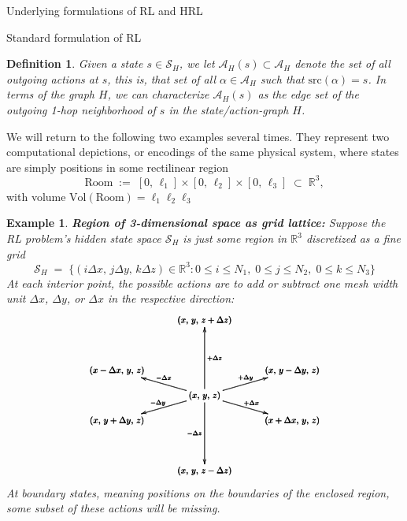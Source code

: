 \documentclass[11pt]{article}
\newtheorem{definition}[subsubsection]{Definition}
\newtheorem{example}[subsubsection]{Example}
\begin{document}
\begin{section}{Underlying formulations of RL and HRL}
\begin{subsection}{Standard formulation of RL}
\begin{definition}
Given a state $s\in\mathcal{S}_{H}$, we let $\mathcal{A}_{H}(s)\subset \mathcal{A}_{H}$ denote the set of all outgoing actions at $s$, this is, that set of all $\alpha\in\mathcal{A}_{H}$ such that
$\text{src}(\alpha)=s$. In terms of the graph $H$, we can characterize $\mathcal{A}_{H}(s)$ as the edge set of the outgoing 1-hop neighborhood of $s$ in the state/action-graph $H$.
\end{definition}

\noindent
We will return to the following two examples several times. They represent two computational depictions, or encodings of the same physical system, where states are simply positions in some rectilinear region
$$
\text{Room}
\;:=\;
[0,\,\ell_1]\times[0,\,\ell_2]\times[0,\,\ell_3]\;\subset\;\mathbb{R}^{3},
$$
with volume $\text{Vol}(\text{Room})=\ell_{1}\ell_{2}\ell_{3}$

\begin{example}\label{ex: actions match projections}
{\bf Region of 3-dimensional space as grid lattice:}
\normalfont
Suppose the RL problem's hidden state space $\mathcal{S}_{H}$ is just some region in $\mathbb{R}^{3}$ discretized as a fine grid
$$
\mathcal{S}_{H}
\;=\;
\Big\{(i\Delta x,\,j\Delta y,\,k\Delta z)\in\mathbb{R}^{3}:
0\le i\le N_1,\;
0\le j\le N_2,\;
0\le k\le N_3
\Big\}
$$
At each interior point, the possible actions are to add or subtract one mesh width unit $\Delta x$, $\Delta y$, or $\Delta x$ in the respective direction:
$$
\scalebox{.8}{$
\pmb{
\begin{xy}
(0,0)*+{(x,\,y,\,z)}="000";
(35,-10)*+{(x+\Delta x,\,y,\,z)}="100";
(-35,10)*+{(x-\Delta x,\,y,\,z)}="-100";
(35,10)*+{(x,\,y-\Delta y,\,z)}="010";
(-35,-10)*+{(x,\,y+\Delta y,\,z)}="0-10";
(0,30)*+{(x,\,y,\,z+\Delta z)}="001";
(0,-30)*+{(x,\,y,\,z-\Delta z)}="00-1";
{\ar^{+\Delta x} "000"; "100"};
{\ar^{+\Delta y} "000"; "010"};
{\ar_{+\Delta z} "000"; "001"};
{\ar_{-\Delta x} "000"; "-100"};
{\ar_{-\Delta y} "000"; "0-10"};
{\ar_{-\Delta z} "000"; "00-1"};
\end{xy}
}
$}
$$
At boundary states, meaning positions on the boundaries of the enclosed region, some subset of these actions will be missing.


\end{example}
\end{subsection}
\end{section}
\end{document}
